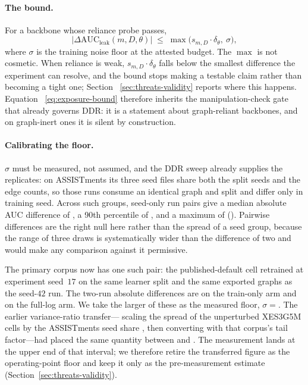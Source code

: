 \documentclass[preprint,10pt,doubleblind]{elsarticle}
\newcommand{\DDR}{\textsc{DDR}}
\begin{document}
\paragraph{The bound.}
For a backbone whose reliance probe passes,
\begin{equation}
\big|\Delta\text{AUC}_{\text{leak}}(m,D,\theta)\big|
  \;\le\; \max\big(s_{m,D}\cdot\delta_\theta,\ \sigma\big),
\label{eq:exposure-bound}
\end{equation}
where $\sigma$ is the training noise floor at the attested budget. The
$\max$ is not cosmetic. When reliance is weak, $s_{m,D}\cdot\delta_\theta$
falls below the smallest difference the experiment can resolve, and the bound
stops making a testable claim rather than becoming a tight one; Section~%
\ref{sec:threats-validity} reports where this happens. Equation~%
\eqref{eq:exposure-bound} therefore inherits the manipulation-check gate that
already governs \DDR{}: it is a statement about graph-reliant backbones, and on
graph-inert ones it is silent by construction.

\paragraph{Calibrating the floor.}
$\sigma$ must be measured, not assumed, and the \DDR{} sweep already supplies
the replicates: on ASSISTments its three seed files share both the split seeds
and the edge counts, so those runs consume an identical graph and split and
differ only in training seed. Across \NoiseFloorGroups{} such groups,
\NoiseFloorPairs{} seed-only run pairs give a median absolute AUC difference of
\NoiseFloorMedian{}, a 90th percentile of \NoiseFloorNinety{}, and a maximum of
\NoiseFloorMax{} (). Pairwise differences are the
right null here rather than the spread of a seed group, because the range of
three draws is systematically wider than the difference of two and would make
any comparison against it permissive.

The primary corpus now has one such pair: the published-default cell retrained
at experiment seed~$17$ on the same learner split and the same exported graphs
as the seed-$42$ run. The two-run absolute differences are
\NoiseFloorPrimaryMeasTO{} on the train-only arm and \NoiseFloorPrimaryMeas{}
on the full-log arm. We take the larger of these as the measured floor,
$\sigma{=}$\NoiseFloorPrimaryMeas{}. The earlier variance-ratio transfer---%
scaling the spread of the unperturbed XES3G5M cells by the ASSISTments seed
share \NoiseFloorSeedShare{}, then converting with that corpus's tail
factor---had placed the same quantity between \NoiseFloorPrimaryLow{} and
\NoiseFloorPrimaryHigh{}. The measurement lands at the upper end of that
interval; we therefore retire the transferred figure as the operating-point
floor and keep it only as the pre-measurement estimate
(Section~\ref{sec:threats-validity}).
\end{document}
